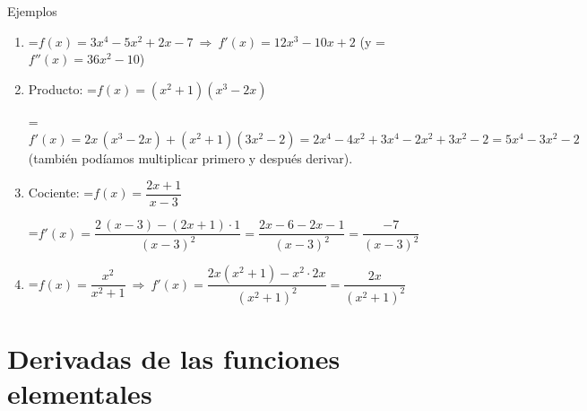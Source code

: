 \documentclass[11pt,a4paper]{article}
\newcommand{\fmm}[1]{\setbox0=\hbox{$#1$}\ifdim\wd0>\linewidth\[#1\]\else\mbox{\box0}\fi}
\begin{document}
  
\begin{fmex}{Ejemplos}
\begin{enumerate}[label=\textbf{\arabic*.},leftmargin=*]
\item \fmm{f(x)=3x^4-5x^2+2x-7\ \Rightarrow\ f'(x)=12x^3-10x+2} (y \fmm{f''(x)=36x^2-10})

\vspace*{0.2cm}

\item Producto: \fmm{f(x)=(x^2+1)(x^3-2x)}
          
\vspace*{0.2cm}
            

\fmm{f'(x)=2x\,(x^3-2x)+(x^2+1)(3x^2-2)=2x^4-4x^2+3x^4-2x^2+3x^2-2=5x^4-3x^2-2}\\
 (también podíamos multiplicar primero y después derivar).\\
 
\item Cociente: \fmm{f(x)=\dfrac{2x+1}{x-3}}
          
\vspace*{0.2cm}
            

\fmm{f'(x)=\dfrac{2\,(x-3)-(2x+1)\cdot1}{(x-3)^2}=\dfrac{2x-6-2x-1}{(x-3)^2}=\dfrac{-7}{(x-3)^2}}\\

\item \fmm{f(x)=\dfrac{x^2}{x^2+1}\ \Rightarrow\ f'(x)=\dfrac{2x(x^2+1)-x^2\cdot2x}{(x^2+1)^2}=\dfrac{2x}{(x^2+1)^2}}
\end{enumerate}
\end{fmex}

  
\section{Derivadas de las funciones elementales}\hypertarget{sec5}{}

  
\end{document}
